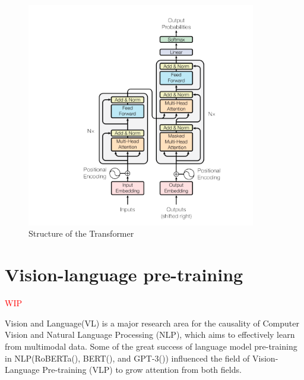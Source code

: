 \begin{figure}[htbp]
    \begin{center}
        \includegraphics[width=10cm]{img/transformer.png}
        \caption{Structure of the Transformer}\label{fig:transformer}
    \end{center}
\end{figure}




\section{Vision-language pre-training}
\textcolor{red}{WIP}

Vision and Language(VL) is a major research area for the causality of Computer Vision and Natural Language Processing (NLP), which aims to effectively learn from multimodal data. Some of the great success of language model pre-training in NLP(RoBERTa(\cite{liu2020roberta}), BERT(\cite{devlin2018bert}), and GPT-3(\cite{brown2020language})) influenced the field of Vision-Language Pre-training (VLP) to grow attention from both fields. 

